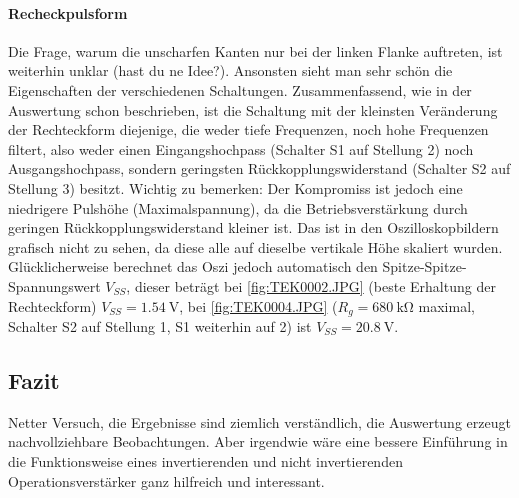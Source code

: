 \paragraph{Recheckpulsform}
Die Frage, warum die unscharfen Kanten nur bei der linken Flanke auftreten, ist weiterhin unklar (hast du ne Idee?). Ansonsten sieht man sehr schön die Eigenschaften der verschiedenen Schaltungen. Zusammenfassend, wie in der Auswertung schon beschrieben, ist die Schaltung mit der kleinsten Veränderung der Rechteckform diejenige, die weder tiefe Frequenzen, noch hohe Frequenzen filtert, also weder einen Eingangshochpass (Schalter S1 auf Stellung 2) noch Ausgangshochpass, sondern geringsten Rückkopplungswiderstand (Schalter S2 auf Stellung 3) besitzt. Wichtig zu bemerken: Der Kompromiss ist jedoch eine niedrigere Pulshöhe (Maximalspannung), da die Betriebsverstärkung durch geringen Rückkopplungswiderstand kleiner ist. Das ist in den Oszilloskopbildern grafisch nicht zu sehen, da diese alle auf dieselbe vertikale Höhe skaliert wurden. Glücklicherweise berechnet das Oszi jedoch automatisch den Spitze-Spitze-Spannungswert \(V_{SS}\), dieser beträgt bei \cref{fig:TEK0002.JPG} (beste Erhaltung der Rechteckform) \(V_{SS}=\qty{1.54}{\volt}\), bei \cref{fig:TEK0004.JPG} (\(R_g=\qty{680}{\kilo\ohm}\) maximal, Schalter S2 auf Stellung 1, S1 weiterhin auf 2) ist \(V_{SS}=\qty{20.8}{\volt}\). 

\subsection{Fazit}  
Netter Versuch, die Ergebnisse sind ziemlich verständlich, die Auswertung erzeugt nachvollziehbare Beobachtungen. Aber irgendwie wäre eine bessere Einführung in die Funktionsweise eines invertierenden und nicht invertierenden Operationsverstärker ganz hilfreich und interessant.
